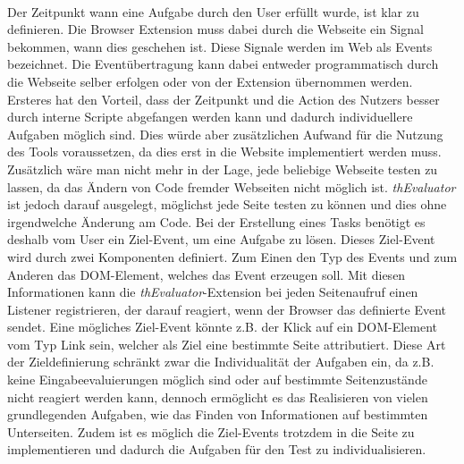 \\
Der Zeitpunkt wann eine Aufgabe durch den User erfüllt wurde, ist klar zu definieren. Die Browser Extension muss dabei durch die Webseite ein Signal bekommen, wann dies geschehen ist. Diese Signale werden im Web als Events bezeichnet. Die Eventübertragung kann dabei entweder programmatisch durch die Webseite selber erfolgen oder von der Extension übernommen werden. Ersteres hat den Vorteil, dass der Zeitpunkt und die Action des Nutzers besser durch interne Scripte abgefangen werden kann und dadurch individuellere Aufgaben möglich sind. Dies würde aber zusätzlichen Aufwand für die Nutzung des Tools voraussetzen, da dies erst in die Website implementiert werden muss. Zusätzlich wäre man nicht mehr in der Lage, jede beliebige Webseite testen zu lassen, da das Ändern von Code fremder Webseiten nicht möglich ist. \textit{thEvaluator} ist jedoch darauf ausgelegt, möglichst jede Seite testen zu können und dies ohne irgendwelche Änderung am Code. Bei der Erstellung eines Tasks benötigt es deshalb vom User ein Ziel-Event, um eine Aufgabe zu lösen. Dieses Ziel-Event wird durch zwei Komponenten definiert. Zum Einen den Typ des Events und zum Anderen das \Gls{DOM}-Element, welches das Event erzeugen soll. Mit diesen Informationen kann die \textit{thEvaluator}-Extension bei jeden Seitenaufruf einen Listener registrieren, der darauf reagiert, wenn der Browser das definierte Event sendet. Eine mögliches Ziel-Event könnte z.B. der Klick auf ein \Gls{DOM}-Element vom Typ Link sein, welcher als Ziel eine bestimmte Seite attributiert. Diese Art der Zieldefinierung schränkt zwar die Individualität der Aufgaben ein, da z.B. keine Eingabeevaluierungen möglich sind oder auf bestimmte Seitenzustände nicht reagiert werden kann, dennoch ermöglicht es das Realisieren von vielen grundlegenden Aufgaben, wie das Finden von Informationen auf bestimmten Unterseiten. Zudem ist es möglich die Ziel-Events trotzdem in die Seite zu implementieren und dadurch die Aufgaben für den Test zu individualisieren.